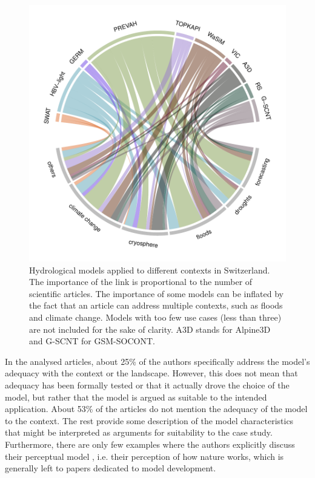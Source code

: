 \documentclass[10pt,a4paper]{article}
\begin{document}
\begin{figure}[htb]
	\begin{center}
		\includegraphics[width=0.70\columnwidth]{figures/chord_diagram_contexts}
		\caption{{Hydrological models applied to different contexts in Switzerland. The importance of the link is proportional to the number of scientific articles. The importance of some models can be inflated by the fact that an article can address multiple contexts, such as floods and climate change. Models with too few use cases (less than three) are not included for the sake of clarity. A3D stands for Alpine3D and G-SCNT for GSM-SOCONT. 
		{\label{fig:applications}}
		}}
	\end{center}
\end{figure}

In the analysed articles, about 25\% of the authors specifically address the model's adequacy with the context or the landscape. However, this does not mean that adequacy has been formally tested or that it actually drove the choice of the model, but rather that the model is argued as suitable to the intended application. About 53\% of the articles do not mention the adequacy of the model to the context. The rest provide some description of the model characteristics that might be interpreted as arguments for suitability to the case study. Furthermore, there are only few examples where the authors explicitly discuss their perceptual model \citep{Beven2021}, i.e. their perception of how nature works, which is generally left to papers dedicated to model development.
\end{document}

